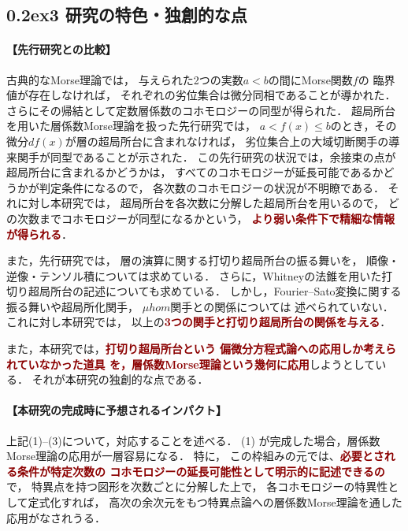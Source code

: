 \documentclass[10pt,a4paper,uplatex,dvipdfmx]{ujarticle} 		%
\newcommand{\研究課題名}{打切り超局所台の関手的性質の研究とMorse理論への応用}
\newcommand{\研究機関名}{北海道大学}
\newcommand{\研究代表者氏名}{大柴寿浩}
\newcommand{\ctext}[1]{\raise0.2ex\hbox{\textcircled{\scriptsize{#1}}}}
\begin{document}
\vspace{-22pt}
\subsection*{\ctext{3} 研究の特色・独創的な点}


\paragraph{【先行研究との比較】}
古典的なMorse理論では，
与えられた2つの実数\(a<b\)の間にMorse関数\(f\)の
臨界値が存在しなければ，
それぞれの劣位集合は微分同相であることが導かれた．
さらにその帰結として定数層係数のコホモロジーの同型が得られた．
超局所台を用いた層係数Morse理論を扱った先行研究\cite{ST92}では，
\(a<f(x)\leq b\)のとき，その微分\(df(x)\)が層の超局所台に含まれなければ，
劣位集合上の大域切断関手の導来関手が同型であることが示された．
この先行研究の状況では，余接束の点が超局所台に含まれるかどうかは，
すべてのコホモロジーが延長可能であるかどうかが判定条件になるので，
各次数のコホモロジーの状況が不明瞭である．
それに対し本研究では，
超局所台を各次数に分解した超局所台を用いるので，
どの次数までコホモロジーが同型になるかという，
\textcolor{darkred}{\textbf{より弱い条件下で精細な情報が得られる}}．

また，先行研究\cite{KMS03a,KMS03b}では，
層の演算に関する打切り超局所台の振る舞いを，
順像・逆像・テンソル積については求めている．
さらに，Whitneyの法錐を用いた打切り超局所台の記述についても求めている．
しかし，Fourier--Sato変換に関する振る舞いや超局所化関手，
\(\mu hom\)関手との関係については
述べられていない．
これに対し本研究では，
以上の\textcolor{darkred}{\textbf{3つの関手と打切り超局所台の関係を与える}}．

また，本研究では，\textcolor{darkred}{\textbf{打切り超局所台という
偏微分方程式論への応用しか考えられていなかった道具
を，層係数Morse理論という幾何に応用}}しようとしている．
それが本研究の独創的な点である．

\vspace{-10pt}
\paragraph{【本研究の完成時に予想されるインパクト】}
上記(1)--(3)について，対応することを述べる．
(1) が完成した場合，層係数Morse理論の応用が一層容易になる．
特に，
この枠組みの元では、\textcolor{darkred}{\textbf{必要とされる条件が特定次数の
コホモロジーの延長可能性として明示的に記述できるの}}で，
特異点を持つ図形を次数ごとに分解した上で，
各コホモロジーの特異性として定式化すれば，
高次の余次元をもつ特異点論への層係数Morse理論を通した応用がなされうる．
\end{document}
